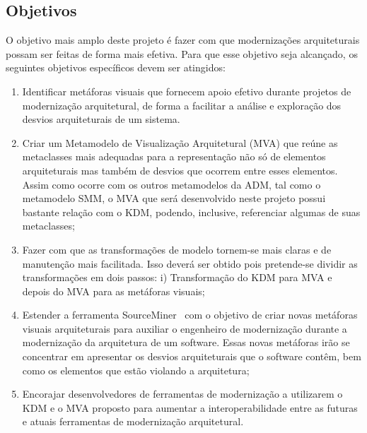 \documentclass[12pt]{article}
\begin{document}
\subsection{Objetivos}

O objetivo mais amplo deste projeto é fazer com que modernizações arquiteturais possam ser feitas de forma mais efetiva. Para que esse objetivo seja alcançado, os seguintes objetivos específicos devem ser atingidos:

\begin{enumerate}
\item Identificar metáforas visuais que fornecem apoio efetivo durante projetos de modernização arquitetural, de forma a facilitar a análise e exploração dos desvios arquiteturais de um sistema.

\item Criar um Metamodelo de Visualização Arquitetural (MVA) que reúne as metaclasses mais adequadas para a representação não só de elementos arquiteturais mas também de desvios que ocorrem entre esses elementos. Assim como ocorre com os outros metamodelos da ADM, tal como o metamodelo SMM, o MVA que será desenvolvido neste projeto possui bastante relação com o KDM, podendo, inclusive, referenciar algumas de suas metaclasses;

\item Fazer com que as transformações de modelo tornem-se mais claras e de manutenção mais facilitada. Isso deverá ser obtido pois pretende-se dividir as transformações em dois passos: i) Transformação do KDM para MVA e depois do MVA para as metáforas visuais;

\item Estender a ferramenta SourceMiner~\cite{source_miner_glauco} com o objetivo de criar novas metáforas visuais arquiteturais para auxiliar o engenheiro de modernização durante a modernização da arquitetura de um software. Essas novas metáforas irão se concentrar em apresentar os desvios arquiteturais que o software contêm, bem como os elementos que estão violando a arquitetura; 

\item Encorajar desenvolvedores de ferramentas de modernização a utilizarem o KDM e o MVA proposto para aumentar a interoperabilidade entre as futuras e atuais ferramentas de modernização arquitetural.

\end{enumerate}


\end{document}
